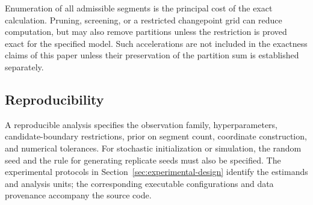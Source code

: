 Enumeration of all admissible segments is the principal cost of the exact calculation. Pruning, screening, or a restricted changepoint grid can reduce computation, but may also remove partitions unless the restriction is proved exact for the specified model. Such accelerations are not included in the exactness claims of this paper unless their preservation of the partition sum is established separately.

\subsection{Reproducibility}
A reproducible analysis specifies the observation family, hyperparameters, candidate-boundary restrictions, prior on segment count, coordinate construction, and numerical tolerances. For stochastic initialization or simulation, the random seed and the rule for generating replicate seeds must also be specified. The experimental protocols in Section~\ref{sec:experimental-design} identify the estimands and analysis units; the corresponding executable configurations and data provenance accompany the source code.
